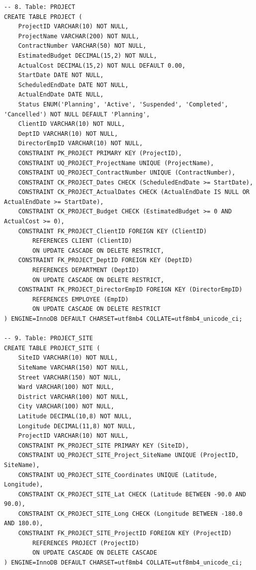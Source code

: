 \documentclass[a4paper,12pt]{report}
\begin{document}
\begin{lstlisting}
-- 8. Table: PROJECT
CREATE TABLE PROJECT (
    ProjectID VARCHAR(10) NOT NULL,
    ProjectName VARCHAR(200) NOT NULL,
    ContractNumber VARCHAR(50) NOT NULL,
    EstimatedBudget DECIMAL(15,2) NOT NULL,
    ActualCost DECIMAL(15,2) NOT NULL DEFAULT 0.00,
    StartDate DATE NOT NULL,
    ScheduledEndDate DATE NOT NULL,
    ActualEndDate DATE NULL,
    Status ENUM('Planning', 'Active', 'Suspended', 'Completed', 'Cancelled') NOT NULL DEFAULT 'Planning',
    ClientID VARCHAR(10) NOT NULL,
    DeptID VARCHAR(10) NOT NULL,
    DirectorEmpID VARCHAR(10) NOT NULL,
    CONSTRAINT PK_PROJECT PRIMARY KEY (ProjectID),
    CONSTRAINT UQ_PROJECT_ProjectName UNIQUE (ProjectName),
    CONSTRAINT UQ_PROJECT_ContractNumber UNIQUE (ContractNumber),
    CONSTRAINT CK_PROJECT_Dates CHECK (ScheduledEndDate >= StartDate),
    CONSTRAINT CK_PROJECT_ActualDates CHECK (ActualEndDate IS NULL OR ActualEndDate >= StartDate),
    CONSTRAINT CK_PROJECT_Budget CHECK (EstimatedBudget >= 0 AND ActualCost >= 0),
    CONSTRAINT FK_PROJECT_ClientID FOREIGN KEY (ClientID)
        REFERENCES CLIENT (ClientID)
        ON UPDATE CASCADE ON DELETE RESTRICT,
    CONSTRAINT FK_PROJECT_DeptID FOREIGN KEY (DeptID)
        REFERENCES DEPARTMENT (DeptID)
        ON UPDATE CASCADE ON DELETE RESTRICT,
    CONSTRAINT FK_PROJECT_DirectorEmpID FOREIGN KEY (DirectorEmpID)
        REFERENCES EMPLOYEE (EmpID)
        ON UPDATE CASCADE ON DELETE RESTRICT
) ENGINE=InnoDB DEFAULT CHARSET=utf8mb4 COLLATE=utf8mb4_unicode_ci;

-- 9. Table: PROJECT_SITE
CREATE TABLE PROJECT_SITE (
    SiteID VARCHAR(10) NOT NULL,
    SiteName VARCHAR(150) NOT NULL,
    Street VARCHAR(150) NOT NULL,
    Ward VARCHAR(100) NOT NULL,
    District VARCHAR(100) NOT NULL,
    City VARCHAR(100) NOT NULL,
    Latitude DECIMAL(10,8) NOT NULL,
    Longitude DECIMAL(11,8) NOT NULL,
    ProjectID VARCHAR(10) NOT NULL,
    CONSTRAINT PK_PROJECT_SITE PRIMARY KEY (SiteID),
    CONSTRAINT UQ_PROJECT_SITE_Project_SiteName UNIQUE (ProjectID, SiteName),
    CONSTRAINT UQ_PROJECT_SITE_Coordinates UNIQUE (Latitude, Longitude),
    CONSTRAINT CK_PROJECT_SITE_Lat CHECK (Latitude BETWEEN -90.0 AND 90.0),
    CONSTRAINT CK_PROJECT_SITE_Long CHECK (Longitude BETWEEN -180.0 AND 180.0),
    CONSTRAINT FK_PROJECT_SITE_ProjectID FOREIGN KEY (ProjectID)
        REFERENCES PROJECT (ProjectID)
        ON UPDATE CASCADE ON DELETE CASCADE
) ENGINE=InnoDB DEFAULT CHARSET=utf8mb4 COLLATE=utf8mb4_unicode_ci;


\end{lstlisting}
\end{document}
